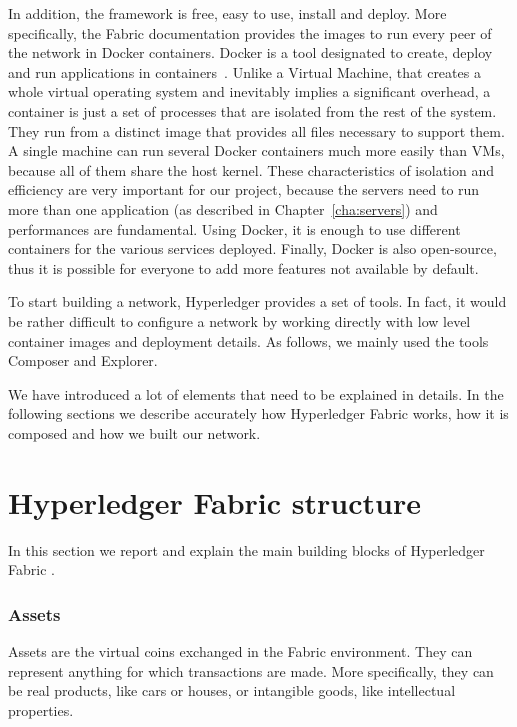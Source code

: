 In addition, the framework is free, easy to use, install and deploy. More specifically, the Fabric documentation provides the images to run every peer of the network in Docker containers. Docker is a tool designated to create, deploy and run applications in containers~\cite{docker}. Unlike a Virtual Machine, that creates a whole virtual operating system and inevitably implies a significant overhead, a container is just a set of processes that are isolated from the rest of the system. They run from a distinct image that provides all files necessary to support them. A single machine can run several Docker containers much more easily than VMs, because all of them share the host kernel. These characteristics of isolation and efficiency are very important for our project, because the servers need to run more than one application (as described in Chapter~\ref{cha:servers}) and performances are fundamental. Using Docker, it is enough to use different containers for the various services deployed. Finally, Docker is also open-source, thus it is possible for everyone to add more features not available by default.


To start building a network, Hyperledger provides a set of tools. In fact, it would be rather difficult to configure a network by working directly with low level container images and deployment details. As follows, we mainly used the tools Composer and Explorer.

We have introduced a lot of elements that need to be explained in details. In the following sections we describe accurately how Hyperledger Fabric works, how it is composed and how we built our network.

\section{Hyperledger Fabric structure}
\label{sec:fabric_structure}
In this section we report and explain the main building blocks of Hyperledger Fabric \cite{hyperledger_paper}.

\subsubsection{Assets}
Assets are the virtual coins exchanged in the Fabric environment. They can represent anything for which transactions are made. More specifically, they can be real products, like cars or houses, or intangible goods, like intellectual properties.

